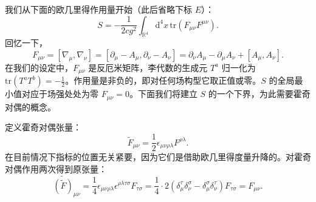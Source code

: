我们从下面的欧几里得作用量开始（此后省略下标 \(E\)）：
\begin{equation}
S = -\frac{1}{2cg^2}\int_{\mathbb{R}^4}\mathrm{d}^4 x\,\mathrm{tr}(F_{\mu \nu}F^{\mu \nu}). \label{eq:YMaction}
\end{equation}
回忆一下，
\begin{equation}
F_{\mu \nu} = [\nabla_{\mu},\nabla_{\nu}] = [\partial_{\mu} - A_{\mu},\partial_{\nu} - A_{\nu}] = \partial_{\nu}A_{\mu} - \partial_{\mu}A_{\nu} + [A_{\mu},A_{\nu}].
\end{equation}
在我们的设定中，\(F_{\mu \nu}\) 是反厄米矩阵，李代数的生成元 \(T^{a}\) 归一化为 \(\mathrm{tr}(T^{a}T^{b}) = -\frac{1}{2}\)。作用量是非负的，即对任何场构型它取正值或零。\(S\) 的全局最小值对应于场强处处为零 \(F_{\mu \nu} = 0\)。下面我们将建立 \(S\) 的一个下界，为此需要霍奇对偶的概念。

定义霍奇对偶张量：
\begin{equation}
\tilde{F}_{\mu \nu} = \frac{1}{2}\epsilon_{\mu \nu \rho \lambda}F^{\rho \lambda}. \label{eq:Hodge}
\end{equation}
在目前情况下指标的位置无关紧要，因为它们是借助欧几里得度量升降的。对霍奇对偶作用两次得到原张量：
\begin{equation}
\widetilde{(\tilde{F})}_{\mu \nu} = \frac{1}{4}\epsilon_{\mu \nu \rho \lambda}\epsilon^{\rho \lambda \tau \sigma}F_{\tau \sigma} = \frac{1}{4} \cdot 2(\delta_{\mu}^{\tau}\delta_{\nu}^{\sigma} - \delta_{\mu}^{\sigma}\delta_{\nu}^{\tau})F_{\tau \sigma} = F_{\mu \nu}.
\end{equation}

